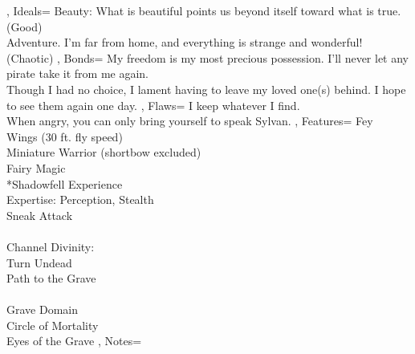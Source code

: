 \documentclass[10pt,a4paper]{scrbook}
\begin{document}
{{		},
		Ideals={
			\tiny
			Beauty: What is beautiful points us beyond itself toward what is true. (Good)\\
			Adventure. I'm far from home, and everything is strange and wonderful! (Chaotic)
		},
		Bonds={
			\tiny
			My freedom is my most precious possession. I’ll never let any pirate take it from me again.\\
			Though I had no choice, I lament having to leave my loved one(s) behind. I hope to see them again one day.
		},
		Flaws={
			\tiny
			I keep whatever I find.\\
			When angry, you can only bring yourself to speak Sylvan.
		},
		Features={
			Fey\\
			Wings (30 ft. fly speed) \\
			Miniature Warrior (shortbow excluded)\\
			Fairy Magic\\
			*Shadowfell Experience\\
			Expertise: Perception, Stealth\\
			Sneak Attack\\
			\\
			Channel Divinity:\\
			Turn Undead\\
			Path to the Grave\\
			\\
			Grave Domain\\
			Circle of Mortality\\
			Eyes of the Grave
		},
		Notes={
			
		}
	}
\end{document}
